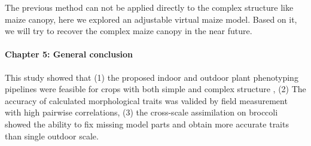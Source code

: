 \begin{eabstract}
  The previous method can not be applied directly to the complex structure like maize canopy, here we explored an adjustable virtual maize model. Based on it, we will try to recover the complex maize canopy in the near future.
 

  \paragraph{Chapter 5: General conclusion}
  
  This study showed that (1) the proposed indoor and outdoor plant phenotyping pipelines were feasible for crops with both simple and complex structure  , (2) The accuracy of calculated morphological traits  was valided by field measurement with high pairwise correlations, (3) the cross-scale assimilation on broccoli showed the ability to fix missing model parts and obtain more accurate traits than single outdoor scale.
  
\end{eabstract}

